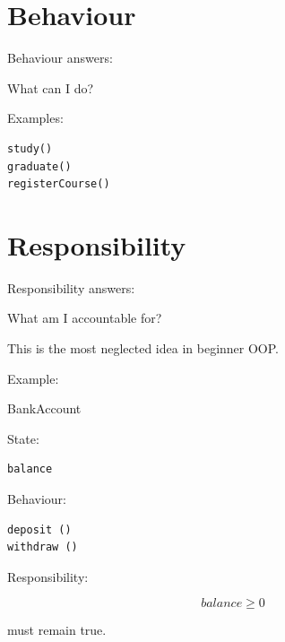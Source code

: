 \documentclass[11pt,a4paper]{book}
\begin{document}
\section{Behaviour}

\begin{idea}

Behaviour answers:

\begin{center}
What can I do?
\end{center}

\end{idea}

Examples:

\begin{verbatim}
study()
graduate()
registerCourse()
\end{verbatim}


\section{Responsibility}

\begin{idea}

Responsibility answers:

\begin{center}
What am I accountable for?
\end{center}

\end{idea}

This is the most neglected idea in beginner OOP.\@


Example:

BankAccount

State:

\begin{verbatim}
balance
\end{verbatim}

Behaviour:

\begin{verbatim}
deposit ()
withdraw ()
\end{verbatim}

Responsibility:

\[
balance \ge 0
\]

must remain true.

\end{document}
